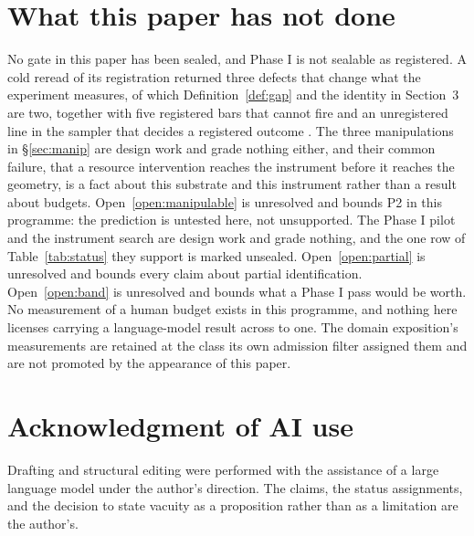 \documentclass[11pt,letterpaper]{article}
\theoremstyle{plain}
\theoremstyle{definition}
\begin{document}
\section{What this paper has not done}

No gate in this paper has been sealed, and Phase I is not sealable as
registered. A cold reread of its registration returned three defects that change
what the experiment measures, of which Definition~\ref{def:gap} and the identity
in Section~3 are two, together with five registered bars that cannot fire and an
unregistered line in the sampler that decides a registered outcome \cite{c1}.
The three manipulations in \S\ref{sec:manip} are design work and
grade nothing either, and their common failure, that a resource intervention
reaches the instrument before it reaches the geometry, is a fact about this
substrate and this instrument rather than a result about budgets.
Open~\ref{open:manipulable} is unresolved and bounds P2 in this programme: the
prediction is untested here, not unsupported. The Phase I pilot and the
instrument search are design work and grade nothing, and the one row of
Table~\ref{tab:status} they support is marked unsealed. Open~\ref{open:partial}
is unresolved and bounds every claim about partial identification.
Open~\ref{open:band} is unresolved and bounds what a Phase I pass would be
worth. No measurement of a human budget exists in this programme, and nothing
here licenses carrying a language-model result across to one. The domain
exposition's measurements are retained at the class its own admission filter
assigned them and are not promoted by the appearance of this paper.

\section*{Acknowledgment of AI use}

Drafting and structural editing were performed with the assistance of a large
language model under the author's direction. The claims, the status assignments,
and the decision to state vacuity as a proposition rather than as a limitation
are the author's.
\end{document}
